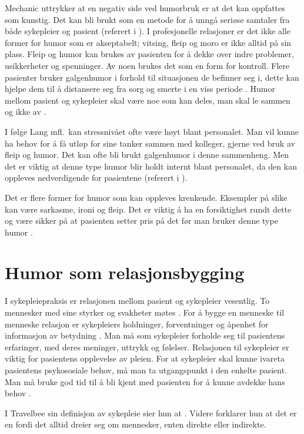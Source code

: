 Mechanic uttrykker at en negativ side ved humorbruk er at det kan
oppfattes som kunstig. Det kan bli brukt som en metode for å unngå seriøse
samtaler fra både sykepleier og pasient (referert i ).
I profesjonelle relasjoner er det ikke alle former for humor som er
akseptabelt; vitsing, fleip og moro er ikke alltid på sin plass. Fleip og humor
kan brukes av pasienten for å dekke over indre problemer, usikkerheter og
spenninger. Av noen brukes det som en form for kontroll. Flere pasienter bruker
galgenhumor i forhold til situasjonen de befinner seg i, dette kan hjelpe dem
til å distansere seg fra sorg og smerte i en viss periode
\cite[s.~56]{bohn2000}. Humor mellom pasient og sykepleier skal være noe som
kan deles, man skal le sammen og ikke av \cite[s.~166]{wist2002}.

I følge Lang mfl.~kan stressnivået ofte være høyt blant personalet. Man vil
kunne ha behov for å få utløp for sine tanker sammen med kolleger, gjerne ved
bruk av fleip og humor. Det kan ofte bli brukt galgenhumor i denne sammenheng.
Men det er viktig at denne type humor blir holdt internt blant personalet, da
den kan oppleves nedverdigende for pasientene (referert i
).

Det er flere former for humor som kan oppleves krenkende. Eksempler på slike
kan være sarkasme, ironi og fleip. Det er viktig å ha en forsiktighet rundt
dette og være sikker på at pasienten setter pris på det før man bruker denne
type humor \cite[s.~246]{eide2008}.

\section{Humor som relasjonsbygging}

I sykepleiepraksis er relasjonen mellom pasient og sykepleier vesentlig. To
mennesker med sine styrker og svakheter møtes \cite[s.~889]{eriksen2015}. For å
bygge en menneske til menneske relasjon er sykepleiers holdninger,
forventninger og åpenhet for informasjon av betydning
\cite[s.~89]{brataas2011}. Man må som sykepleier forholde seg til pasientens
erfaringer, med deres meninger, uttrykk og følelser.
Relasjonen til sykepleier er viktig for pasientens opplevelse av pleien. For at
sykepleier skal kunne ivareta pasientens psykososiale behov, må man ta
utgangspunkt i den enkelte pasient.  Man må bruke god tid til å bli kjent med
pasienten for å kunne avdekke hans behov \cite[s.~889--901]{eriksen2015}.

I Travelbee sin definisjon av sykepleie sier hun at
. Videre forklarer
hun at det er en  fordi det alltid dreier
seg om mennesker, enten direkte eller indirekte.

